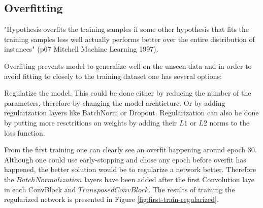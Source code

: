 \subsection{Overfitting}

\begin{definition}[Overfitting]
    "Hypothesis overfits the training samples if some other hypothesis that fits the training samples less well actually performs better over the entire distribution of instances" (p67 Mitchell Machine Learning 1997).
\end{definition}

Overfiting prevents model to generalize well on the unseen data and in order to avoid fitting to closely to the training dataset one has several options:

Regulatize the model. This could be done either by reducing the number of the parameters, therefore by changing the model archticture. Or by adding regularization layers like BatchNorm or Dropout. Regularization can also be done by putting more resctritions on weights by adding their $L1$ or $L2$ norms to the loss function.

From the first training one can clearly see an overfit happening around epoch 30. Although one could use early-stopping and chose any epoch before overfit has happened, the better solution would be to regularize a network better. Therefore the $BatchNormalization$ layers have been added after the first Convolution laye in each ConvBlock and $TransposedConvBlock$. The results of training the regularized network is presented in Figure \ref{fig:first-train-regularized}.